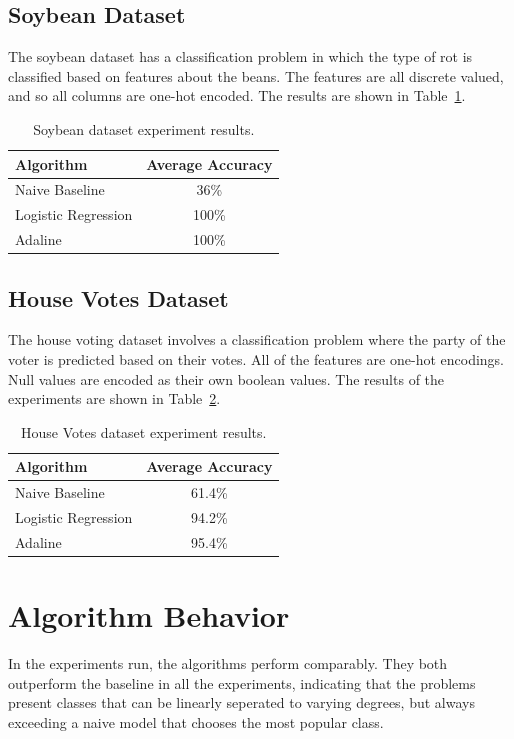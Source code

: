 \documentclass{amsart}
\begin{document}
    \subsection{Soybean Dataset}
    The soybean dataset\cite{soybeandataset} has a classification
    problem in which the type of rot is classified based on
    features about the beans. The features are all discrete
    valued, and so all columns are one-hot encoded. The results
    are shown in Table~\ref{soybean_results}.
    \begin{table}[H]
    \begin{tabular}{lc}
    Algorithm & Average Accuracy \\
    \hline
    Naive Baseline & 36\% \\
    Logistic Regression & 100\% \\
    Adaline & 100\%
    \end{tabular}
    \label{soybean_results}
    \caption{Soybean dataset experiment results.}
    \end{table}

    \subsection{House Votes Dataset}
    The house voting dataset\cite{housedataset} involves a classification
    problem where the party of the voter is predicted
    based on their votes. All of the features are one-hot encodings.
    Null values are encoded as their own boolean values.
    The results of the experiments are shown in Table~\ref{house_votes_results}.
    \begin{table}[H]
    \begin{tabular}{lc}
    Algorithm & Average Accuracy \\
    \hline
    Naive Baseline & 61.4\% \\
    Logistic Regression & 94.2\% \\
    Adaline & 95.4\%
    \end{tabular}
    \label{house_votes_results}
    \caption{House Votes dataset experiment results.}
    \end{table}

    \section{Algorithm Behavior}
    In the experiments run, the algorithms perform comparably. They both
    outperform the baseline in all the experiments, indicating that the
    problems present classes that can be linearly seperated to varying degrees,
    but always exceeding a naive model that chooses the most popular class.
\end{document}
